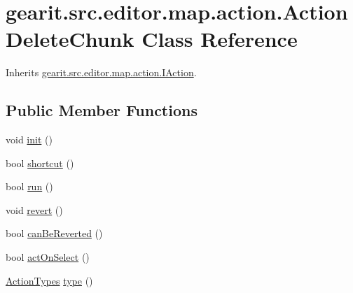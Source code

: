 \hypertarget{classgearit_1_1src_1_1editor_1_1map_1_1action_1_1_action_delete_chunk}{\section{gearit.\+src.\+editor.\+map.\+action.\+Action\+Delete\+Chunk Class Reference}
\label{classgearit_1_1src_1_1editor_1_1map_1_1action_1_1_action_delete_chunk}
}


Inherits \hyperlink{interfacegearit_1_1src_1_1editor_1_1map_1_1action_1_1_i_action}{gearit.\+src.\+editor.\+map.\+action.\+I\+Action}.

\subsection*{Public Member Functions}
\begin{DoxyCompactItemize}
\item 
void \hyperlink{classgearit_1_1src_1_1editor_1_1map_1_1action_1_1_action_delete_chunk_a5ec992f7dc58254fea2673915539f81f}{init} ()
\item 
bool \hyperlink{classgearit_1_1src_1_1editor_1_1map_1_1action_1_1_action_delete_chunk_acade44a0fc2b96d4ec36f83d9ac58825}{shortcut} ()
\item 
bool \hyperlink{classgearit_1_1src_1_1editor_1_1map_1_1action_1_1_action_delete_chunk_ae5111c78d37802e4da8b8c6c68b1199e}{run} ()
\item 
void \hyperlink{classgearit_1_1src_1_1editor_1_1map_1_1action_1_1_action_delete_chunk_a87ba782afdc9c5b1beafd43e0b02acf9}{revert} ()
\item 
bool \hyperlink{classgearit_1_1src_1_1editor_1_1map_1_1action_1_1_action_delete_chunk_a9581118aca0accecee771add62406f89}{can\+Be\+Reverted} ()
\item 
bool \hyperlink{classgearit_1_1src_1_1editor_1_1map_1_1action_1_1_action_delete_chunk_a1c88502373f8ff247073fe48be0f4012}{act\+On\+Select} ()
\item 
\hyperlink{namespacegearit_1_1src_1_1editor_1_1map_1_1action_af036712a7d960b13d1e31954e65c00e3}{Action\+Types} \hyperlink{classgearit_1_1src_1_1editor_1_1map_1_1action_1_1_action_delete_chunk_a0bd80436de6e7d84261e3911294cbbec}{type} ()
\end{DoxyCompactItemize}



